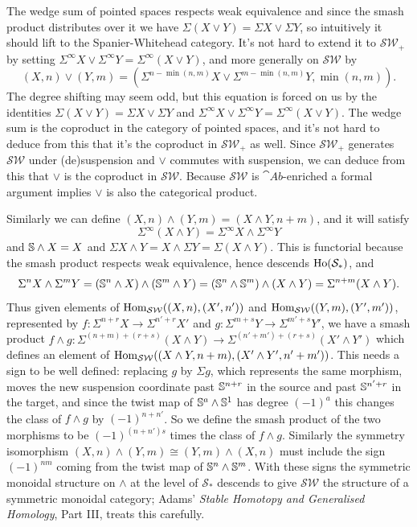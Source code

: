 The wedge sum of pointed spaces respects weak equivalence and since the smash product distributes over it we have \(\Sigma (X \vee Y) = \Sigma X \vee \Sigma Y\), so intuitively it should lift to the Spanier-Whitehead category. It's not hard to extend it to \(\mathcal{SW}_+\) by setting \(\Sigma^\infty X \vee \Sigma^\infty Y = \Sigma^\infty (X \vee Y)\), and more generally on \(\mathcal{SW}\) by \[(X, n) \vee (Y, m) = \left(\Sigma^{n - \min(n, m)} X \vee \Sigma^{m - \min(n, m)} Y, \min(n, m)\right).\]The degree shifting may seem odd, but this equation is forced on us by the identities \(\Sigma (X \vee Y) = \Sigma X \vee \Sigma Y\) and \(\Sigma^\infty X \vee \Sigma^\infty Y = \Sigma^\infty (X \vee Y)\). The wedge sum is the coproduct in the category of pointed spaces, and it's not hard to deduce from this that it's the coproduct in \(\mathcal{SW}_+\) as well. Since \(\mathcal{SW}_+\) generates \(\mathcal{SW}\) under (de)suspension and \(\vee\) commutes with suspension, we can deduce from this that \(\vee\) is the coproduct in \(\mathcal{SW}\). Because \(\mathcal{SW}\) is \(\cat{Ab}\)-enriched a formal argument implies \(\vee\) is also the categorical product.

Similarly we can define \((X, n) \wedge (Y, m) = (X \wedge Y, n + m)\), and it will satisfy \[\Sigma^\infty (X \wedge Y) = \Sigma^\infty X \wedge \Sigma^\infty Y\]and \(\S \wedge X = X\) and \(\Sigma X \wedge Y = X \wedge \Sigma Y = \Sigma (X \wedge Y)\). This is functorial because the smash product respects weak equivalence, hence descends \(\Ho(\mathcal{S}_*)\), and \[\Sigma^n X \wedge \Sigma^m Y = (\S^n \wedge X) \wedge (\S^m \wedge Y) = (\S^n \wedge \S^m) \wedge (X \wedge Y) = \Sigma^{n+m}(X \wedge Y).\]Thus given elements of \(\Hom_{\mathcal{SW}}((X, n), (X', n'))\) and \(\Hom_{\mathcal{SW}}((Y, m), (Y', m'))\), represented by \(f : \Sigma^{n+r} X \to \Sigma^{n'+r} X'\) and \(g : \Sigma^{m+s} Y \to \Sigma^{m'+s} Y'\), we have a smash product \(f \wedge g : \Sigma^{(n+m)+(r+s)} (X \wedge Y) \to \Sigma^{(n'+m')+(r+s)} (X' \wedge Y')\) which defines an element of \(\Hom_{\mathcal{SW}}((X \wedge Y, n + m), (X' \wedge Y', n' + m'))\). This needs a sign to be well defined: replacing \(g\) by \(\Sigma g\), which represents the same morphism, moves the new suspension coordinate past \(\S^{n+r}\) in the source and past \(\S^{n'+r}\) in the target, and since the twist map of \(\S^a \wedge \S^1\) has degree \((-1)^a\) this changes the class of \(f \wedge g\) by \((-1)^{n+n'}\). So we define the smash product of the two morphisms to be \((-1)^{(n+n')s}\) times the class of \(f \wedge g\). Similarly the symmetry isomorphism \((X, n) \wedge (Y, m) \cong (Y, m) \wedge (X, n)\) must include the sign \((-1)^{nm}\) coming from the twist map of \(\S^n \wedge \S^m\). With these signs the symmetric monoidal structure on \(\wedge\) at the level of \(\mathcal{S}_*\) descends to give \(\mathcal{SW}\) the structure of a symmetric monoidal category; Adams' \emph{Stable Homotopy and Generalised Homology}, Part III, treats this carefully.

